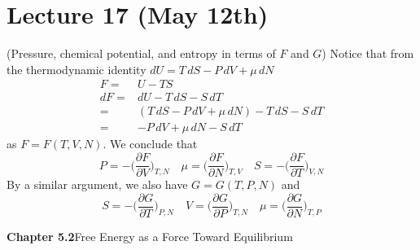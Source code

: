 \section{Lecture 17 (May 12th)}
\begin{thm}
(Pressure, chemical potential, and entropy in terms of $F$ and $G$) Notice that from the thermodynamic identity $dU=T\,dS-P\,dV+\mu \,dN$
\begin{align*}
F=&U-TS\\
dF=&dU-T\,dS-S\,dT\\
=&(T\,dS-P\,dV+\mu\,dN)-T\,dS-S\,dT\\
=&-P\,dV+\mu\,dN-S\,dT
\end{align*}
as $F=F(T,V,N)$. We conclude that
\[P=-\Big(\dfrac{\partial F}{\partial V} \Big)_{T,N}\quad \mu =\Big(\dfrac{\partial F}{\partial N} \Big)_{T,V}\quad S=-\Big(\dfrac{\partial F}{\partial T} \Big)_{V,N}\]
By a similar argument, we also have $G=G(T,P,N)$ and
\[S=-\Big(\dfrac{\partial G}{\partial T} \Big)_{P,N}\quad V=\Big(\dfrac{\partial G}{\partial P} \Big)_{T,N}\quad \mu =\Big(\dfrac{\partial G}{\partial N} \Big)_{T,P}\]
\end{thm}
\vspace{2ex}
{\bf Chapter 5.2}\hspace{2ex}Free Energy as a Force Toward Equilibrium
\\

